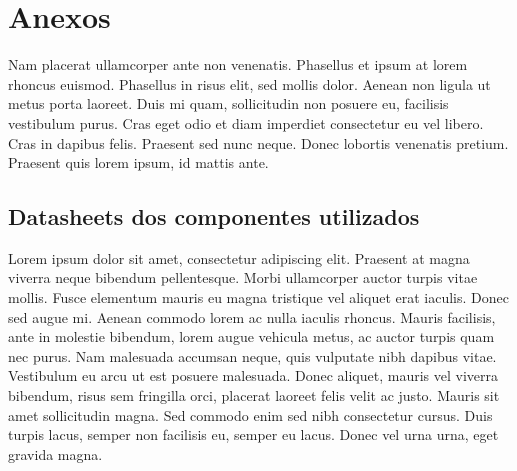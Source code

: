 \chapter{Anexos} \label{chap:anexos}

Nam placerat ullamcorper ante non venenatis. Phasellus et ipsum at lorem rhoncus euismod. Phasellus in risus elit, sed mollis dolor. Aenean non ligula ut metus porta laoreet. Duis mi quam, sollicitudin non posuere eu, facilisis vestibulum purus. Cras eget odio et diam imperdiet consectetur eu vel libero. Cras in dapibus felis. Praesent sed nunc neque. Donec lobortis venenatis pretium. Praesent quis lorem ipsum, id mattis ante. 


\section{Datasheets dos componentes utilizados}

Lorem ipsum dolor sit amet, consectetur adipiscing elit. Praesent at magna viverra neque bibendum pellentesque. Morbi ullamcorper auctor turpis vitae mollis. Fusce elementum mauris eu magna tristique vel aliquet erat iaculis. Donec sed augue mi. Aenean commodo lorem ac nulla iaculis rhoncus. Mauris facilisis, ante in molestie bibendum, lorem augue vehicula metus, ac auctor turpis quam nec purus. Nam malesuada accumsan neque, quis vulputate nibh dapibus vitae. Vestibulum eu arcu ut est posuere malesuada. Donec aliquet, mauris vel viverra bibendum, risus sem fringilla orci, placerat laoreet felis velit ac justo. Mauris sit amet sollicitudin magna. Sed commodo enim sed nibh consectetur cursus. Duis turpis lacus, semper non facilisis eu, semper eu lacus. Donec vel urna urna, eget gravida magna.